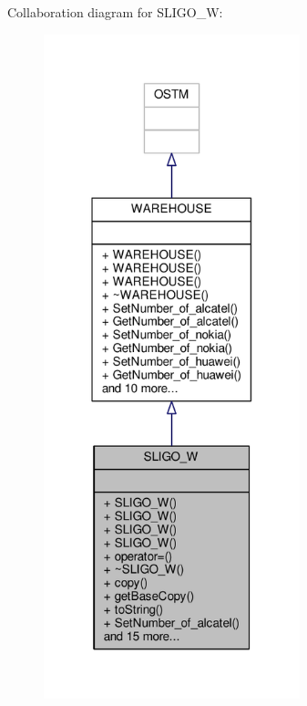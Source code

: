 Collaboration diagram for S\+L\+I\+G\+O\+\_\+W\+:
\nopagebreak
\begin{figure}[H]
\begin{center}
\leavevmode
\includegraphics[width=211pt]{class_s_l_i_g_o___w__coll__graph}
\end{center}
\end{figure}
